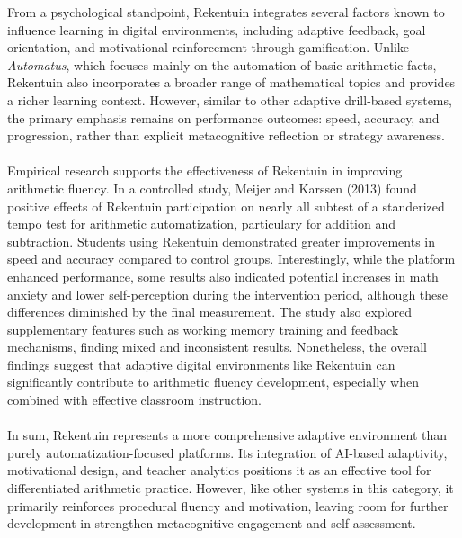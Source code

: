 From a psychological standpoint, Rekentuin integrates several factors known to influence learning in digital environments, including adaptive feedback, goal orientation, and motivational reinforcement through gamification. Unlike \textit{Automatus}, which focuses mainly on the automation of basic arithmetic facts, Rekentuin also incorporates a broader range of mathematical topics and provides a richer learning context. However, similar to other adaptive drill-based systems, the primary emphasis remains on performance outcomes: speed, accuracy, and progression, rather than explicit metacognitive reflection or strategy awareness.\\ \\
Empirical research supports the effectiveness of Rekentuin in improving arithmetic fluency. In a controlled study, Meijer and Karssen (2013) \cite{meijer_effecten_nodate} found positive effects of Rekentuin participation on nearly all subtest of a standerized tempo test for arithmetic automatization, particulary for addition and subtraction. Students using Rekentuin demonstrated greater improvements in speed and accuracy compared to control groups. Interestingly, while the platform enhanced performance, some results also indicated potential increases in math anxiety and lower self-perception during the intervention period, although these differences diminished by the final measurement. The study also explored supplementary features such as working memory training and feedback mechanisms, finding mixed and inconsistent results. Nonetheless, the overall findings suggest that adaptive digital environments like Rekentuin can significantly contribute to arithmetic fluency development, especially when combined with effective classroom instruction. \\ \\
In sum, Rekentuin represents a more comprehensive adaptive environment than purely automatization-focused platforms. Its integration of AI-based adaptivity, motivational design, and teacher analytics positions it as an effective tool for differentiated arithmetic practice. However, like other systems in this category, it primarily reinforces procedural fluency and motivation, leaving room for further development in strengthen metacognitive engagement and self-assessment.





